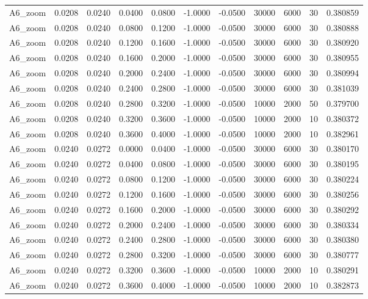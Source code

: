 \documentclass{article}
\begin{document}
\begin{longtable}{l r r r r r r r r r l}
A6_zoom & 0.0208 & 0.0240 & 0.0400 & 0.0800 & -1.0000 & -0.0500 & 30000 & 6000 & 30 & 0.380859 \\
A6_zoom & 0.0208 & 0.0240 & 0.0800 & 0.1200 & -1.0000 & -0.0500 & 30000 & 6000 & 30 & 0.380888 \\
A6_zoom & 0.0208 & 0.0240 & 0.1200 & 0.1600 & -1.0000 & -0.0500 & 30000 & 6000 & 30 & 0.380920 \\
A6_zoom & 0.0208 & 0.0240 & 0.1600 & 0.2000 & -1.0000 & -0.0500 & 30000 & 6000 & 30 & 0.380955 \\
A6_zoom & 0.0208 & 0.0240 & 0.2000 & 0.2400 & -1.0000 & -0.0500 & 30000 & 6000 & 30 & 0.380994 \\
A6_zoom & 0.0208 & 0.0240 & 0.2400 & 0.2800 & -1.0000 & -0.0500 & 30000 & 6000 & 30 & 0.381039 \\
A6_zoom & 0.0208 & 0.0240 & 0.2800 & 0.3200 & -1.0000 & -0.0500 & 10000 & 2000 & 50 & 0.379700 \\
A6_zoom & 0.0208 & 0.0240 & 0.3200 & 0.3600 & -1.0000 & -0.0500 & 10000 & 2000 & 10 & 0.380372 \\
A6_zoom & 0.0208 & 0.0240 & 0.3600 & 0.4000 & -1.0000 & -0.0500 & 10000 & 2000 & 10 & 0.382961 \\
A6_zoom & 0.0240 & 0.0272 & 0.0000 & 0.0400 & -1.0000 & -0.0500 & 30000 & 6000 & 30 & 0.380170 \\
A6_zoom & 0.0240 & 0.0272 & 0.0400 & 0.0800 & -1.0000 & -0.0500 & 30000 & 6000 & 30 & 0.380195 \\
A6_zoom & 0.0240 & 0.0272 & 0.0800 & 0.1200 & -1.0000 & -0.0500 & 30000 & 6000 & 30 & 0.380224 \\
A6_zoom & 0.0240 & 0.0272 & 0.1200 & 0.1600 & -1.0000 & -0.0500 & 30000 & 6000 & 30 & 0.380256 \\
A6_zoom & 0.0240 & 0.0272 & 0.1600 & 0.2000 & -1.0000 & -0.0500 & 30000 & 6000 & 30 & 0.380292 \\
A6_zoom & 0.0240 & 0.0272 & 0.2000 & 0.2400 & -1.0000 & -0.0500 & 30000 & 6000 & 30 & 0.380334 \\
A6_zoom & 0.0240 & 0.0272 & 0.2400 & 0.2800 & -1.0000 & -0.0500 & 30000 & 6000 & 30 & 0.380380 \\
A6_zoom & 0.0240 & 0.0272 & 0.2800 & 0.3200 & -1.0000 & -0.0500 & 30000 & 6000 & 30 & 0.380777 \\
A6_zoom & 0.0240 & 0.0272 & 0.3200 & 0.3600 & -1.0000 & -0.0500 & 10000 & 2000 & 10 & 0.380291 \\
A6_zoom & 0.0240 & 0.0272 & 0.3600 & 0.4000 & -1.0000 & -0.0500 & 10000 & 2000 & 10 & 0.382873 \\

\end{longtable}
\end{document}
